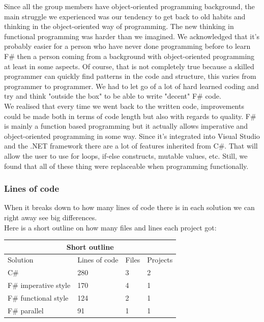 \documentclass[12pt, a4paper]{article}
\begin{document}
Since all the group members have object-oriented programming background, the main struggle we experienced was our tendency to get back to old habits and thinking in the object-oriented way of programming. The new thinking in functional programming was harder than we imagined. We acknowledged that it's probably easier for a person who have never done programming before to learn F\# then a person coming from a background with object-oriented programming at least in some aspects. Of course, that is not completely true because a skilled programmer can quickly find patterns in the code and structure, this varies from programmer to programmer. We had to let go of a lot of hard learned coding and try and think "outside the box" to be able to write "decent" F\# code.\\

We realised that every time we went back to the written code, improvements could be made both in terms of code length but also with regards to quality. F\# is mainly a function based programming but it actually allows imperative and object-oriented programming in some way. Since it's integrated into Visual Studio and the .NET framework there are a lot of features inherited from C\#. That will allow the user to use for loops, if-else constructs, mutable values, etc. Still, we found that all of these thing were replaceable when programming functionally.\\

\newpage

\subsubsection{Lines of code}
\label{linesOfCode}
When it breaks down to how many lines of code there is in each solution we can right away see big differences.\\

Here is a short outline on how many files and lines each project got:\\

\begin{tabular}{ |p{4cm}|p{3cm}|p{2cm}|p{3cm}|  }
 \hline
 \multicolumn{4}{|c|}{Short outline} \\
 \hline
 Solution & Lines of code & Files & Projects\\
 \hline
 C\# & 280 & 3 & 2\\
 F\# imperative style & 170 & 4 & 1\\
 F\# functional style & 124 & 2 & 1\\
 F\# parallel & 91 & 1 & 1\\
 \hline
\end{tabular}
\end{document}
